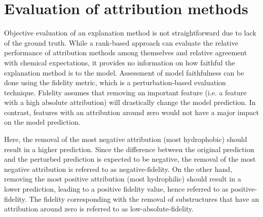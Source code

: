 \section{Evaluation of attribution methods}


Objective evaluation of an explanation method is not straightforward due to lack
of the ground truth. While a rank-based approach can evaluate the relative performance of attribution methods among 
themselves and relative agreement with chemical expectations, it provides no information on how faithful the 
explanation method is to the model. Assessment of model faithfulness can be done using the 
fidelity metric, which is a perturbation-based evaluation technique.\cite{yuan2022explainability} 
Fidelity assumes that removing an important feature (i.e. a feature with a high absolute attribution) will 
drastically change the model prediction. In contrast, features with an attribution around zero 
would not have a major impact on the model prediction.


Here, the removal of the most negative attribution (most hydrophobic) should result 
in a higher prediction. Since the difference between the original prediction and 
the perturbed prediction is expected to be negative, the removal of the most negative 
attribution is referred to as negative-fidelity. On the other hand, removing the most 
positive attribution (most hydrophilic) should result in a lower prediction, leading to a positive fidelity 
value, hence referred to as positive-fidelity. The fidelity corresponding with the removal 
of substructures that have an attribution around zero is referred to as low-absolute-fidelity.

